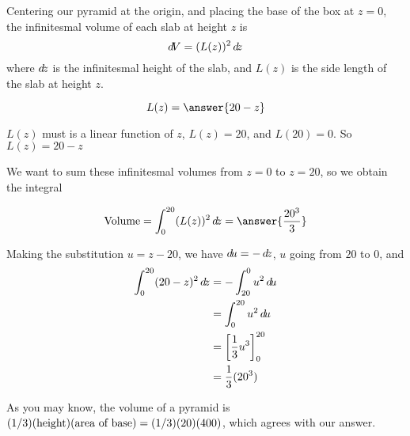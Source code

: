\documentclass{ximera}
\begin{document}
\begin{example}
\begin{explanation}
Centering our pyramid at the origin, and placing the base of the box at $z = 0$,
the infinitesmal volume of each slab at height $z$ is 
\[
\mathop{}\!d\! V = (L(z))^2 \mathop{}\!d\! z
\]
where $\mathop{}\!d\! z$ is the infinitesmal height of the slab, and $L(z)$ is the side length of the slab at height $z$. 

\begin{question}
\[
L(z) = \answer{20-z}
\]

\begin{hint}
	$L(z)$ must is a linear function of $z$, $L(z) = 20$, and $L(20) = 0$.  So $L(z) = 20-z$
\end{hint}
\end{question}

We want to sum these infinitesmal volumes from $z=0$ to $z = 20$, so we obtain the integral

\begin{question}
\[
\textrm{Volume} = \int_0^{20} (L(z))^2 \d z = \answer{\frac{20^3}{3}}
\]

\begin{hint}
	Making the substitution $u = z-20$, we have $\mathop{}\!d\! u = - \mathop{}\!d\! z$, $u$ going from $20$ to $0$, and 
	\begin{align*}
	\int_0^{20} (20-z)^2 \mathop{}\!d\! z &= -\int_{20}^{0} u^2 \mathop{}\!d\! u\\
		&= \int_0^{20} u^2 \mathop{}\!d\! u\\
		&= \bigg[ \frac{1}{3} u^3 \bigg]_0^{20}\\
		&= \frac{1}{3}(20^3)
	\end{align*}
\end{hint}
\end{question}

As you may know, the volume of a pyramid is 
$(1/3)(\hbox{height})(\hbox{area of base})=(1/3)(20)(400)$, which
agrees with our answer.
\end{explanation}
\end{example}
\end{document}
